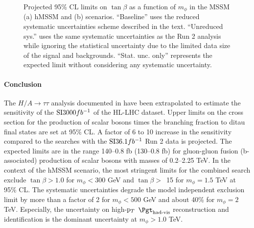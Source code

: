 \begin{figure}[!ht]
    \centering
        \qquad
        \caption{Projected 95\% CL limits on $\tan\beta$ as a function of $m_\phi$ in the MSSM (a) hMSSM and 
        (b) \mhmodp scenarios. ``Baseline'' uses the reduced systematic uncertainties scheme described in the text.
        ``Unreduced sys.'' uses the same systematic uncertainties as the Run 2 analysis while ignoring 
        the statistical uncertainty due to the limited data size of the signal and backgrounds. 
        ``Stat. unc. only'' represents the expected limit without considering any systematic uncertainty.}
    \label{fig:model1}
\end{figure}

\FloatBarrier

\paragraph{Conclusion}
\label{sec:conclusion}

The $H/A \to \tau\tau$ analysis documented in \cite{ATLASRun2Ditau} have been extrapolated to estimate 
the sensitivity of the $\mathrm{SI}{3000}{fb^{-1}}$ of the HL-LHC dataset. Upper limits on the cross section for the production of 
scalar bosons times the branching fraction to ditau final states are set at 95\% CL. A factor of 6 to 10 increase in 
the sensitivity compared to the searches with the  $\mathrm{SI}{36.1}{fb^{-1}}$ Run 2 data \cite{ATLASRun2Ditau} is projected. 
The expected limits are in the range 140--0.8 fb (130--0.8 fb) for gluon-gluon fusion (b-associated) production of scalar 
bosons with masses of 0.2--2.25 TeV. In the context of the hMSSM scenario, the most stringent limits 
for the combined search exclude $\tan\beta > 1.0$ for $m_\phi < 300$ GeV and $\tan\beta >$~15 for $m_\phi = 1.5$ TeV 
at 95\% CL. The systematic uncertainties degrade the model independent exclusion limit by more than a factor of 2 
for $m_\phi<500$ GeV and about 40\% for  $m_\phi=2$ TeV. Especially, the uncertainty on high-$\mathrm{p}_{T}$ $\tauhadvis$
reconstruction and identification is the dominant uncertainty at $m_\phi>1.0$ TeV. 
